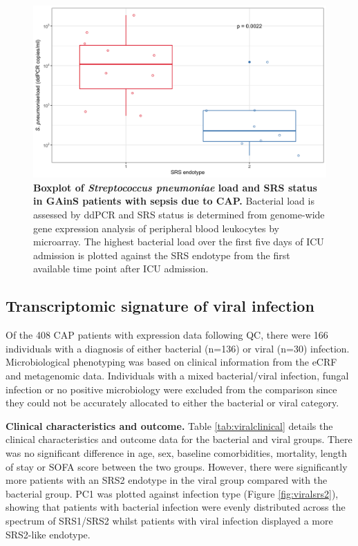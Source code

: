 \FloatBarrier
\begin{figure}[htbp]
\centering
\includegraphics[width=\textwidth]{./Results3/Images/strepsrs.png}
\caption[\textit{S. pneumoniae} load and SRS status]{\textbf{Boxplot of \textit{Streptococcus pneumoniae} load and SRS status in GAinS patients with sepsis due to CAP.} Bacterial load is assessed by ddPCR and SRS status is determined from genome-wide gene expression analysis of peripheral blood leukocytes by microarray. The highest bacterial load over the first five days of ICU admission is plotted against the SRS endotype from the first available time point after ICU admission.}
\label{fig:strepsrs}


\end{figure}
\FloatBarrier

\subsection{Transcriptomic signature of viral infection}
Of the 408 CAP patients with expression data following QC, there were 166 individuals with a diagnosis of either bacterial (n=136) or viral (n=30) infection. Microbiological phenotyping was based on clinical information from the eCRF and metagenomic data. Individuals with a mixed bacterial/viral infection, fungal infection or no positive microbiology were excluded from the comparison since they could not be accurately allocated to either the bacterial or viral category.

\textbf{Clinical characteristics and outcome.} Table \ref{tab:viralclinical} details the clinical characteristics and outcome data for the bacterial and viral groups. There was no significant difference in age, sex, baseline comorbidities, mortality, length of stay or SOFA score between the two groups. However, there were significantly more patients with an SRS2 endotype in the viral group compared with the bacterial group. PC1 was plotted against infection type (Figure \ref{fig:viralsrs2}), showing that patients with bacterial infection were evenly distributed across the spectrum of SRS1/SRS2 whilst patients with viral infection displayed a more SRS2-like endotype.

